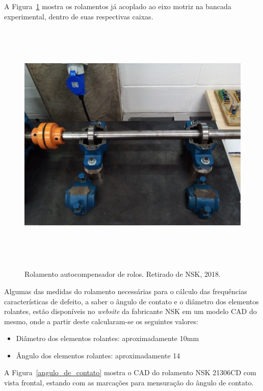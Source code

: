 \documentclass[
	12pt,				
	oneside,			
	a4paper,			
	english,			
	brazil,			
	]{abntex2ppgsi}
\begin{document}
A Figura~\ref{rolamento_caixa_aberta} mostra os rolamentos já acoplado ao eixo motriz na bancada experimental, dentro de suas respectivas caixas.

\begin{figure}[H]
\centering
\caption {Rolamento autocompensador de rolos. Retirado de NSK, 2018.}
\includegraphics[width=\textwidth,height=120mm,keepaspectratio]{rolamento_caixa_aberta}
\label{rolamento_caixa_aberta}
\end{figure} 

Algumas das medidas do rolamento necessárias para o cálculo das frequências características de defeito, a saber o ângulo de contato e o diâmetro dos elementos rolantes, estão disponíveis no \textit{website} da fabricante NSK em um modelo CAD do mesmo, onde a partir deste calcularam-se os seguintes valores:

\begin{itemize}
	\item Diâmetro dos elementos rolantes: aproximadamente 10\si{\mm}
	\item Ângulo dos elementos rolantes: aproximadamente 14\textdegree
\end{itemize}

A Figura~\ref{angulo_de_contato} mostra o CAD do rolamento NSK 21306CD com vista frontal, estando com as marcações para mensuração do ângulo de contato. 
\end{document}
